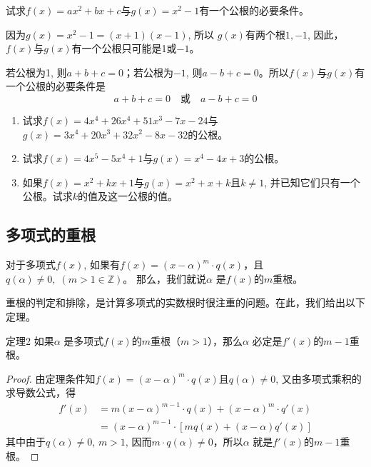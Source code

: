 \begin{example}
    试求$f(x)=ax^2+bx+c$与$g(x)=x^2-1$有一个公根的必要条件。
\end{example}

\begin{solution}
    因为$g(x)=x^2-1=(x+1)(x-1)$, 所以
    $g(x)$有两个根$1,-1$, 因此，$f(x)$与$g(x)$有一个公根只可能是1或$-1$。

若公根为1, 则$a+b+c=0$；若公根为$-1$, 则$a-b+c=0$。所以$f(x)$与$g(x)$有一个公根的必要条件是
\[a+b+c=0\quad \text{或}\quad a-b+c=0\]
\end{solution}

\begin{ex}
    \begin{enumerate}
        \item 试求$f(x)=4x^4+26x^4+51x^3-7x-24$与
$g(x)=3x^4+20x^3+32x^2-8x-32$的公根。
\item 试求$f(x)=4x^5-5x^4+1$与$g(x)=x^4-4x+3$的公根。
\item 如果$f(x)=x^2+kx+1$与$g(x)=x^2+x+k$且$k\ne 1$,
并已知它们只有一个公根。试求$k$的值及这一公根的值。
    \end{enumerate}
\end{ex}

\subsection{多项式的重根}

对于多项式$f(x)$, 如果有$f(x)=(x-\alpha )^m\cdot q(x)$，且$q(\alpha )\ne 0,\; (m>1\in\mathbb{Z})$。
那么，我们就说$\alpha$ 是$f(x)$的$m$重根。

重根的判定和排除，是计算多项式的实数根时很注重的问题。在此，我们给出以下定理。

\begin{blk}{定理2}
    如果$\alpha$ 是多项式$f(x)$的$m$重根（$m>1$），那么$\alpha$ 必定是$f'(x)$的$m-1$重根。
\end{blk}

\begin{proof}
    由定理条件知$f(x)=(x-\alpha )^m\cdot q(x)$且$q(\alpha )\ne 0$, 又由多项式乘积的求导数公式，得
\[\begin{split}
     f' (x) &=m (x-\alpha )^{m-1}\cdot q (x) + (x-\alpha )^m\cdot q'(x)\\
&=(x-\alpha ) ^{m-1}\cdot  [mq (x) + (x-\alpha ) q' (x) ]
\end{split}\]
其中由于$q(\alpha )\ne 0$, $m>1$, 因而$m\cdot q(\alpha )\ne 0$，所以$\alpha$ 就是$f'(x)$的$m-1$重根。
\end{proof}

